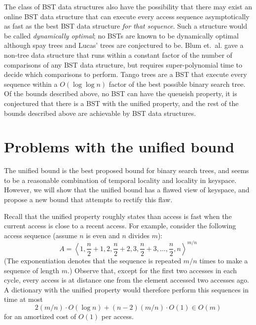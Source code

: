 \documentclass{llncs}
\newcommand{\BigOh}[1]{O\!\left(#1\right)}
\begin{document}
The class of BST data structures also have the possibility that there may exist an online BST data structure that can execute every access sequence asymptotically as fast as the best BST data structure \emph{for that sequence}. Such a structure would be called \emph{dynamically optimal}; no BSTs are known to be dynamically optimal although spay trees and Lucas' trees \cite{lucas} are conjectured to be. Blum et.~al. \cite{blum} gave a non-tree data structure that runs within a constant factor of the number of comparisons of any BST data structure, but requires super-polynomial time to decide which comparisons to perform. Tango trees \cite{DBLP:journals/siamcomp/DemaineHIP07} are a BST that execute every sequence within a $\BigOh{\log \log n}$ factor of the best possible binary search tree. Of the bounds described above, no BST can have the queueish property, it is conjectured that there is a BST with the unified property, and the rest of the bounds described above are achievable by BST data structures.

\section{Problems with the unified bound}

The unified bound is the best proposed bound for binary search trees, and seems to be a reasonable combination of temporal locality and locality in keyspace. However, we will show that the unified bound has a flawed view of keyspace, and propose a new bound that attempts to rectify this flaw.

Recall that the unified property roughly states than access is fast when the current access is close to a recent access. For example, consider the following access sequence (assume $n$ is even and $n$ divides $m$): %
\begin{equation}
	A = \left\langle 1, \frac{n}{2}+1, 2, \frac{n}{2}+2, 3, \frac{n}{2}+3, \ldots, \frac{n}{2}, n \right\rangle^{m/n} \label{eq:bear}
\end{equation}
(The exponentiation denotes that the sequence is repeated $m/n$ times
to make a sequence of length $m$.)
Observe that, except for the first two accesses in each cycle, every access is at distance one from the element accessed two accesses ago.  A dictionary with the unified
property would therefore perform this sequences in time at most
\[
   2(m/n)\cdot \BigOh{\log n} + (n-2)(m/n)\cdot \BigOh{1} \in \BigOh{m}
\]
for an amortized cost of $\BigOh{1}$ per access.  
\end{document}
